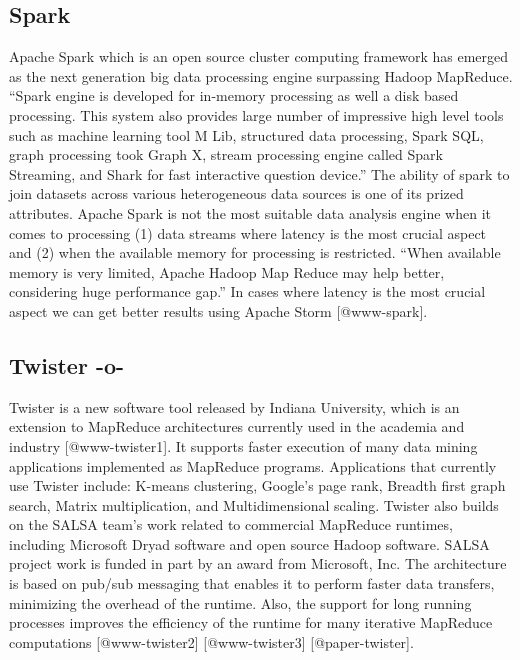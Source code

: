 \subsection{Spark}

Apache Spark which is an open source cluster computing framework has
emerged as the next generation big data processing engine surpassing
Hadoop MapReduce. ``Spark engine is developed for in-memory processing
as well a disk based processing. This system also provides large
number of impressive high level tools such as machine learning tool M
Lib, structured data processing, Spark SQL, graph processing took
Graph X, stream processing engine called Spark Streaming, and Shark
for fast interactive question device.'' The ability of spark to join
datasets across various heterogeneous data sources is one of its
prized attributes. Apache Spark is not the most suitable data analysis
engine when it comes to processing (1) data streams where latency is
the most crucial aspect and (2) when the available memory for
processing is restricted. ``When available memory is very limited,
Apache Hadoop Map Reduce may help better, considering huge performance
gap.'' In cases where latency is the most crucial aspect we can get
better results using Apache Storm [@www-spark].
     
\subsection{Twister -o-}

Twister is a new software tool released by Indiana University, which
is an extension to MapReduce architectures currently used in the
academia and industry [@www-twister1]. It supports faster
execution of many data mining applications implemented as MapReduce
programs. Applications that currently use Twister include: K-means
clustering, Google's page rank, Breadth first graph search, Matrix
multiplication, and Multidimensional scaling. Twister also builds on
the SALSA team's work related to commercial MapReduce runtimes,
including Microsoft Dryad software and open source Hadoop
software. SALSA project work is funded in part by an award from
Microsoft, Inc. The architecture is based on pub/sub messaging that
enables it to perform faster data transfers, minimizing the overhead
of the runtime. Also, the support for long running processes improves
the efficiency of the runtime for many iterative MapReduce
computations [@www-twister2] [@www-twister3] [@paper-twister].



